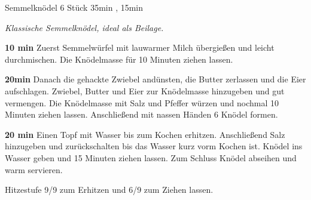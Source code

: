 \documentclass[../recipe-collections/cooking.tex]{subfiles}
\begin{document}
\begin{recipe}{Semmelknödel} {6 Stück } {35min , 15min }

  \freeform{}\textit{Klassische Semmelknödel, ideal als Beilage.}


  \textbf{10 min}
  Zuerst Semmelwürfel mit lauwarmer Milch übergießen und leicht durchmischen.
  Die Knödelmasse für 10 Minuten ziehen lassen.


  \textbf{20min}
  Danach die gehackte Zwiebel andünsten, die Butter zerlassen und die Eier aufschlagen.
  Zwiebel, Butter und Eier zur Knödelmasse hinzugeben und gut vermengen.
  Die Knödelmasse mit Salz und Pfeffer würzen und nochmal 10 Minuten ziehen lassen.
  Anschließend mit nassen Händen 6 Knödel formen.

  \newstep{}\textbf{20 min}
  Einen Topf mit Wasser bis zum Kochen erhitzen.
  Anschließend Salz hinzugeben und zurückschalten bis das Wasser kurz vorm Kochen ist.
  Knödel ins Wasser geben und 15 Minuten ziehen lassen.
  Zum Schluss Knödel abseihen und warm servieren.

  \freeform{}\hrulefill{}

  \freeform{}
  Hitzestufe 9/9 zum Erhitzen und 6/9 zum Ziehen lassen.

\end{recipe}
\end{document}
